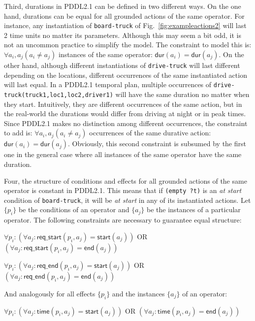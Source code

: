 \documentclass[runningheads]{llncs}
\newcommand{\dur}{\mathsf{dur}}    %
\newcommand{\start}{\mathsf{start}}%
\newcommand{\en}{\mathsf{end}}     %
\newcommand{\tim}{\mathsf{time}}   %
\newcommand{\reqs}{\mathsf{req\_{start}}} %
\newcommand{\reqe}{\mathsf{req\_{end}}}   %
\begin{document}


Third, durations in PDDL2.1 can be defined in two different ways. On the one hand, durations can be equal for all grounded actions of the same operator. For instance, any instantiation of \texttt{board-truck} of Fig.~\ref{fig:exampleactions2} will last 2 time units no matter its parameters. Although this may seem a bit odd, it is not an uncommon practice to simplify the model. The constraint to model this is: $\forall a_i,a_j (a_i \neq a_j)$ instances of the same operator: $\dur(a_i) = \dur(a_j)$.
On the other hand, although different instantiations of \texttt{drive-truck} will last different depending on the locations, different occurrences of the same instantiated action will last equal.
In a PDDL2.1 temporal plan, multiple occurrences of \texttt{drive-truck(truck1,loc1,loc2,driver1)} will have the same duration no matter when they start. Intuitively, they are different occurrences of the same action, but in the real-world the durations would differ from driving at night or in peak times. Since PDDL2.1 makes no distinction among different occurrences, the constraint to add is: $\forall a_i,a_j (a_i \neq a_j)$ occurrences of the same durative action: $\dur(a_i) = \dur(a_j)$.
Obviously, this second constraint is subsumed by the first one in the general case where all instances of the same operator have the same duration.


Four, the structure of conditions and effects for all grounded actions of the same operator is constant in PDDL2.1. This means that if \texttt{(empty ?t)} is an \emph{at start} condition of \texttt{board-truck}, it will be \emph{at start} in any of its instantiated actions.
Let $\{p_i\}$ be the conditions of an operator and $\{a_j\}$ be the instances of a particular operator. The following constraints are necessary to guarantee equal structure:

$\forall p_i: (\forall a_j: \reqs(p_i,a_j) = \start(a_j))$ OR $(\forall a_j: \reqs(p_i,a_j) = \en(a_j))$

$\forall p_i: (\forall a_j: \reqe(p_i,a_j) = \start(a_j))$ OR $(\forall a_j: \reqe(p_i,a_j) = \en(a_j))$

And analogously for all effects $\{p_i\}$ and the instances $\{a_j\}$ of an operator:

$\forall p_i: (\forall a_j: \tim(p_i,a_j) = \start(a_j))$ OR $(\forall a_j: \tim(p_i,a_j) = \en(a_j))$
\end{document}
